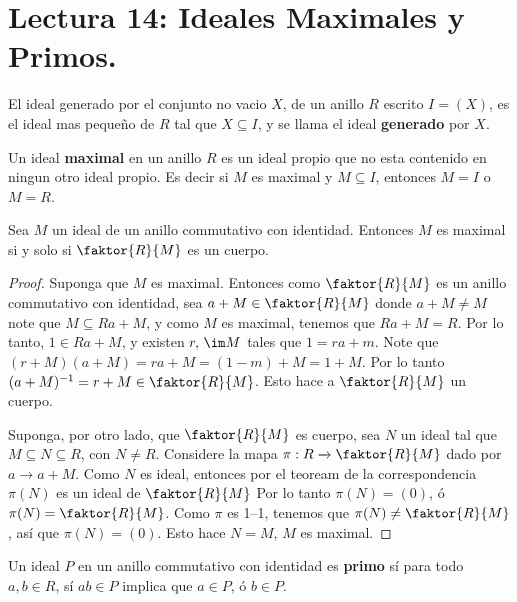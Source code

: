 \section*{Lectura 14: Ideales Maximales y Primos.}

\begin{definition}
    El ideal generado por el conjunto no vacio $X$, de un anillo $R$ escrito
    $I=(X)$, es el ideal mas peque\~no de $R$ tal que  $X \subseteq I$, y se
    llama el ideal  \textbf{generado} por $X$.
\end{definition}

\begin{definition}
    Un ideal \textbf{maximal} en un anillo $R$ es un ideal propio que no esta
    contenido en ningun otro ideal propio. Es decir si $M$ es maximal y  $M
    \subseteq I$, entonces  $M=I$ o  $M=R$.
\end{definition}

\begin{theorem}\label{14.61}
    Sea $M$ un ideal de un anillo commutativo con identidad. Entonces  $M$ es
    maximal si y solo si  $\faktor{R}{M}$ es un cuerpo.
\end{theorem}
\begin{proof}
    Suponga que $M$ es maximal. Entonces como $\faktor{R}{M}$ es un anillo
    commutativo con identidad, sea $a+M \in \faktor{R}{M}$ donde $a+M \neq M$
    note que  $M \subseteq Ra+M$, y como $M$ es maximal, tenemos que $Ra+M=R$.
    Por lo tanto,  $1 \in Ra+M$, y existen  $r, \, \im M$ tales que  $1=ra+m$.
    Note que  $(r+M)(a+M)=ra+M=(1-m)+M=1+M$. Por lo tanto $\inv{(a+M)}=r+M \in
    \faktor{R}{M}$. Esto hace a $\faktor{R}{M}$ un cuerpo.

    Suponga, por otro lado, que $\faktor{R}{M}$ es cuerpo, sea $N$ un ideal tal
    que  $M \subseteq N \subseteq R$, con  $N \neq R$. Considere la mapa  $\pi:R
    \xrightarrow{} \faktor{R}{M}$ dado por $a \xrightarrow{} a+M$. Como $N$ es
    ideal, entonces por el teoream de la correspondencia $\pi(N)$ es un ideal de
    $\faktor{R}{M}$ Por lo tanto $\pi(N)=(0)$, \'o $\pi(N)=\faktor{R}{M}$. Como
    $\pi$ es 1--1, tenemos que  $\pi(N) \neq \faktor{R}{M}$, as\'i que
    $\pi(N)=(0)$. Esto hace $N=M$, $M$ es maximal.
\end{proof}

\begin{definition}
    Un ideal $P$ en un anillo commutativo con identidad es \textbf{primo} s\'i
    para todo $a,b \in R$, s\'i  $ab \in P$ implica que $a \in P$, \'o $b \in P$.
\end{definition}

